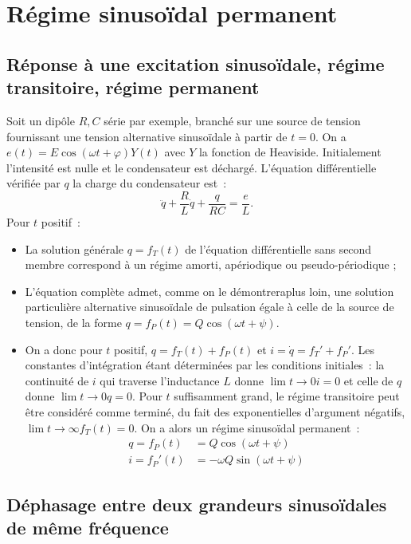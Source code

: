 \chapter{Régime sinusoïdal permanent}%
\minitoc{}
\minilof{}
\minilot{}

\section{Réponse à une excitation sinusoïdale, régime transitoire, régime 
permanent}%

Soit un dipôle \(R, C\) série par exemple, branché sur une source de tension
fournissant une tension alternative sinusoïdale à partir de \(t=0\). On a
\(e(t) = E\cos(\omega t + \varphi) Y(t)\) avec \(Y\) la fonction de
Heaviside. Initialement l'intensité est nulle et le condensateur est
déchargé. L'équation différentielle vérifiée par \(q\) la charge du
condensateur est~: \[ \ddot{q} + \frac{R}{L} \dot{q} + \frac{q}{RC} =
\frac{e}{L}.\]
Pour \(t\) positif~:
\begin{itemize}
  \item La solution générale \(q= f_T(t)\) de l'équation différentielle 
    sans second membre correspond à un régime amorti, apériodique ou 
    pseudo-périodique ;
  \item L'équation complète admet, comme on le démontreraplus loin, une 
    solution particulière alternative sinusoïdale de pulsation égale à 
    celle de la source de tension, de la forme \(q = f_P(t) = Q 
    \cos(\omega t +\psi)\).
  \item On a donc pour \(t\) positif, \(q = f_T(t) + f_P(t)\) et \(i = 
    \dot{q} = f_T' + f_P'\). Les constantes d'intégration étant 
    déterminées par les conditions initiales~: la continuité de \(i\) 
    qui traverse l'inductance \(L\) donne \(\lim\limits{t \to 0} i = 
    0\) et celle de \(q\) donne \(\lim\limits{t \to 0} q = 0\). Pour 
    \(t\) suffisamment grand, le régime transitoire peut être considéré 
    comme terminé, du fait des exponentielles d'argument négatifs, 
    \(\lim\limits{t \to \infty} f_T(t) = 0\). On a alors un régime 
    sinusoïdal permanent~:
    \begin{align}
      q = f_P(t) &= Q \cos(\omega t +\psi) \\
      i = f_P'(t) &= -\omega Q\sin(\omega t +\psi)
    \end{align}
\end{itemize}
\section{Déphasage entre deux grandeurs sinusoïdales de même fréquence}%
